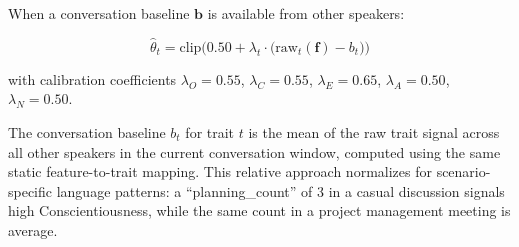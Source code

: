 \documentclass[12pt, a4paper]{report}
\begin{document}
When a conversation baseline $\mathbf{b}$ is available from other speakers:

\begin{equation}
    \hat{\theta}_t = \text{clip}\Big(0.50 + \lambda_t \cdot \big(\text{raw}_t(\mathbf{f}) - b_t\big)\Big)
    \label{eq:dynamic}
\end{equation}

\noindent with calibration coefficients $\lambda_O = 0.55$, $\lambda_C = 0.55$, $\lambda_E = 0.65$, $\lambda_A = 0.50$, $\lambda_N = 0.50$.

The conversation baseline $b_t$ for trait $t$ is the mean of the raw trait signal across all other speakers in the current conversation window, computed using the same static feature-to-trait mapping. This relative approach normalizes for scenario-specific language patterns: a ``planning\_count'' of 3 in a casual discussion signals high Conscientiousness, while the same count in a project management meeting is average.
\end{document}
